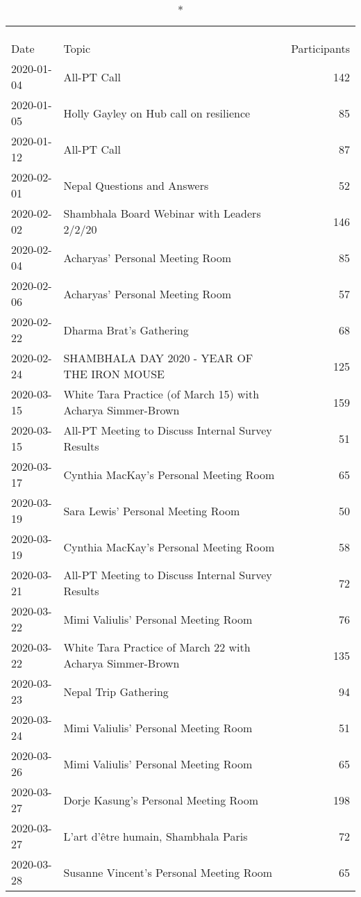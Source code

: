 \documentclass[
]{article}
\begin{document}
\captionsetup[table]{labelformat=empty,skip=1pt}
\begin{longtable}{llr}
\caption*{
\large Large meetings between 2020-01 and 2020-05\\ 
\small \\ 
} \\ 
\toprule
Date & Topic & Participants \\ 
\midrule
2020-01-04 & All-PT Call & 142 \\ 
2020-01-05 & Holly Gayley on Hub call on resilience & 85 \\ 
2020-01-12 & All-PT Call & 87 \\ 
2020-02-01 & Nepal Questions and Answers & 52 \\ 
2020-02-02 & Shambhala Board Webinar with Leaders 2/2/20 & 146 \\ 
2020-02-04 & Acharyas' Personal Meeting Room & 85 \\ 
2020-02-06 & Acharyas' Personal Meeting Room & 57 \\ 
2020-02-22 & Dharma Brat's Gathering & 68 \\ 
2020-02-24 & SHAMBHALA DAY 2020 - YEAR OF THE IRON MOUSE & 125 \\ 
2020-03-15 & White Tara Practice (of March 15) with Acharya Simmer-Brown & 159 \\ 
2020-03-15 & All-PT Meeting to Discuss Internal Survey Results & 51 \\ 
2020-03-17 & Cynthia MacKay's Personal Meeting Room & 65 \\ 
2020-03-19 & Sara Lewis' Personal Meeting Room & 50 \\ 
2020-03-19 & Cynthia MacKay's Personal Meeting Room & 58 \\ 
2020-03-21 & All-PT Meeting to Discuss Internal Survey Results & 72 \\ 
2020-03-22 & Mimi Valiulis' Personal Meeting Room & 76 \\ 
2020-03-22 & White Tara Practice of March 22 with Acharya Simmer-Brown & 135 \\ 
2020-03-23 & Nepal Trip Gathering & 94 \\ 
2020-03-24 & Mimi Valiulis' Personal Meeting Room & 51 \\ 
2020-03-26 & Mimi Valiulis' Personal Meeting Room & 65 \\ 
2020-03-27 & Dorje Kasung's Personal Meeting Room & 198 \\ 
2020-03-27 & L'art d'être humain, Shambhala Paris & 72 \\ 
2020-03-28 & Susanne Vincent's Personal Meeting Room & 65 \\ 

\end{longtable}
\end{document}
